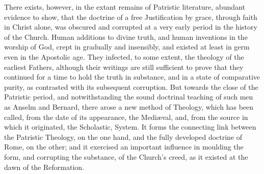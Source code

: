 \documentclass[
]{book}
\begin{document}
There exists, however, in the extant remains of Patristic literature, abundant evidence to show, that the doctrine of a free Justification by grace, through faith in Christ alone, was obscured and corrupted at a very early period in the history of the Church. Human additions to divine truth, and human inventions in the worship of God, crept in gradually and insensibly, and existed at least in germ even in the Apostolic age. They infected, to some extent, the theology of the earliest Fathers, although their writings are still sufficient to prove that they continued for a time to hold the truth in substance, and in a state of comparative purity, as contrasted with its subsequent corruption. But towards the close of the Patristic period, and notwithstanding the sound doctrinal teaching of such men as Anselm and Bernard, there arose a new method of Theology, which has been called, from the date of its appearance, the Mediæval, and, from the source in which it originated, the Scholastic, System. It forms the connecting link between the Patristic Theology, on the one hand, and the fully developed doctrine of Rome, on the other; and it exercised an important influence in moulding the form, and corrupting the substance, of the Church's creed, as it existed at the dawn of the Reformation.
\end{document}
